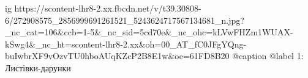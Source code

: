  
 
 
 
 

\ifcmt
  ig https://scontent-lhr8-2.xx.fbcdn.net/v/t39.30808-6/272908575_2856999691261521_5243624717567134681_n.jpg?_nc_cat=106&ccb=1-5&_nc_sid=5cd70e&_nc_ohc=kLVwFHZm1WUAX-kSwg4&_nc_ht=scontent-lhr8-2.xx&oh=00_AT_fC0JFgYQng-buIwbrXF9vOzvTU0hboAUqKZcP2B8E1w&oe=61FD8B20
  @caption @label 1: Листівки-дарунки
\fi
